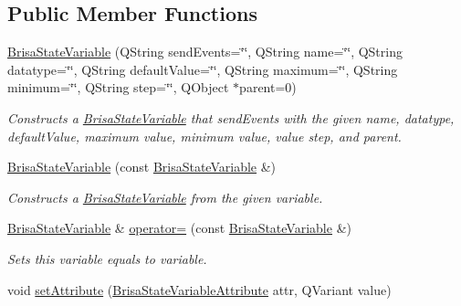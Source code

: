 \subsection*{Public Member Functions}
\begin{DoxyCompactItemize}
\item 
\hyperlink{classBrisaUpnp_1_1BrisaStateVariable_ad73ae0037a7032da20159fbc359a6a23}{BrisaStateVariable} (QString sendEvents=\char`\"{}\char`\"{}, QString name=\char`\"{}\char`\"{}, QString datatype=\char`\"{}\char`\"{}, QString defaultValue=\char`\"{}\char`\"{}, QString maximum=\char`\"{}\char`\"{}, QString minimum=\char`\"{}\char`\"{}, QString step=\char`\"{}\char`\"{}, QObject $\ast$parent=0)
\begin{DoxyCompactList}\small\item\em Constructs a \hyperlink{classBrisaUpnp_1_1BrisaStateVariable}{BrisaStateVariable} that {\itshape sendEvents\/} with the given {\itshape name\/}, {\itshape datatype\/}, {\itshape defaultValue\/}, {\itshape maximum\/} value, {\itshape minimum\/} value, value {\itshape step\/}, and {\itshape parent\/}. \item\end{DoxyCompactList}\item 
\hyperlink{classBrisaUpnp_1_1BrisaStateVariable_a30a706c2b604a395af735b5f90400e11}{BrisaStateVariable} (const \hyperlink{classBrisaUpnp_1_1BrisaStateVariable}{BrisaStateVariable} \&)
\begin{DoxyCompactList}\small\item\em Constructs a \hyperlink{classBrisaUpnp_1_1BrisaStateVariable}{BrisaStateVariable} from the given {\itshape variable\/}. \item\end{DoxyCompactList}\item 
\hyperlink{classBrisaUpnp_1_1BrisaStateVariable}{BrisaStateVariable} \& \hyperlink{classBrisaUpnp_1_1BrisaStateVariable_ac8e1d86af0a88a9ed59e6cd679765317}{operator=} (const \hyperlink{classBrisaUpnp_1_1BrisaStateVariable}{BrisaStateVariable} \&)
\begin{DoxyCompactList}\small\item\em Sets this variable equals to {\itshape variable\/}. \item\end{DoxyCompactList}\item 
void \hyperlink{classBrisaUpnp_1_1BrisaStateVariable_acdd6630338a3855a59e707b2095df677}{setAttribute} (\hyperlink{classBrisaUpnp_1_1BrisaStateVariable_af6afe40d25c8990351bc7205dada3249}{BrisaStateVariableAttribute} attr, QVariant value)

\end{DoxyCompactItemize}
